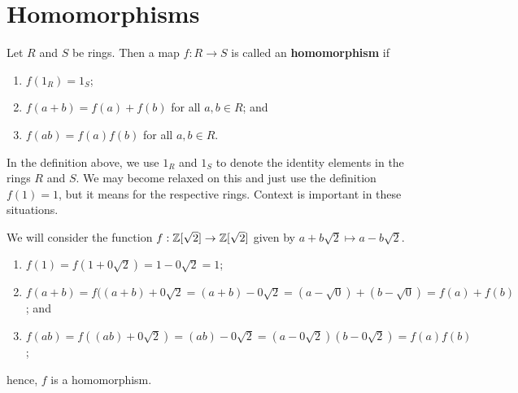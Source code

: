 \chapter{Homomorphisms}

\begin{definition}[Homomorphism]
    Let $R$ and $S$ be rings. Then a map $f: R \to S$ is called an \textbf{homomorphism} if
    \begin{enumerate}
        \item $f(1_R) = 1_S$;
        \item $f(a + b) = f(a) + f(b)$ for all $a, b \in R$; and
        \item $f(ab) = f(a) f(b)$ for all $a, b \in R$.
    \end{enumerate}
\end{definition}

\begin{remark}
    In the definition above, we use $1_R$ and $1_S$ to denote the identity elements in the rings $R$ and $S$. We may become relaxed on this and just use the definition $f(1) = 1$, but it means for the respective rings. Context is important in these situations.
\end{remark}

\begin{example}
    We will consider the function $f: \mathbb{Z}[\sqrt 2] \to \mathbb{Z}[\sqrt 2]$ given by $a + b\sqrt 2 \mapsto a-b\sqrt 2$. 
    \begin{enumerate}
        \item $f(1) = f(1 + 0\sqrt 2) = 1 - 0\sqrt 2 = 1$;
        \item $f(a + b) = f((a + b) + 0\sqrt 2 = (a + b) - 0 \sqrt 2 = (a - \sqrt 0) + (b - \sqrt 0) = f(a) + f(b)$; and
        \item $f(ab) = f((ab) + 0\sqrt 2) = (ab) - 0\sqrt 2 = (a - 0\sqrt 2)(b - 0\sqrt 2) = f(a)f(b)$;
    \end{enumerate}
    hence, $f$ is a homomorphism.
\end{example}

